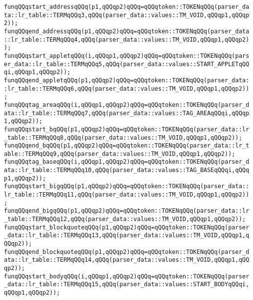 \verb|funqQQqstart_addressqQQq(p1,qQQqp2)qQQq=qQQqtoken::TOKENqQQq(parser_data::lr_table::TERMqQQq3,qQQq(parser_data::values::TM_VOID,qQQqp1,qQQqp2));|\newline
\verb|funqQQqend_addressqQQq(p1,qQQqp2)qQQq=qQQqtoken::TOKENqQQq(parser_data::lr_table::TERMqQQq4,qQQq(parser_data::values::TM_VOID,qQQqp1,qQQqp2));|\newline
\verb|funqQQqstart_appletqQQq(i,qQQqp1,qQQqp2)qQQq=qQQqtoken::TOKENqQQq(parser_data::lr_table::TERMqQQq5,qQQq(parser_data::values::START_APPLETqQQqi,qQQqp1,qQQqp2));|\newline
\verb|funqQQqend_appletqQQq(p1,qQQqp2)qQQq=qQQqtoken::TOKENqQQq(parser_data::lr_table::TERMqQQq6,qQQq(parser_data::values::TM_VOID,qQQqp1,qQQqp2));|\newline
\verb|funqQQqtag_areaqQQq(i,qQQqp1,qQQqp2)qQQq=qQQqtoken::TOKENqQQq(parser_data::lr_table::TERMqQQq7,qQQq(parser_data::values::TAG_AREAqQQqi,qQQqp1,qQQqp2));|\newline
\verb|funqQQqstart_bqQQq(p1,qQQqp2)qQQq=qQQqtoken::TOKENqQQq(parser_data::lr_table::TERMqQQq8,qQQq(parser_data::values::TM_VOID,qQQqp1,qQQqp2));|\newline
\verb|funqQQqend_bqQQq(p1,qQQqp2)qQQq=qQQqtoken::TOKENqQQq(parser_data::lr_table::TERMqQQq9,qQQq(parser_data::values::TM_VOID,qQQqp1,qQQqp2));|\newline
\verb|funqQQqtag_baseqQQq(i,qQQqp1,qQQqp2)qQQq=qQQqtoken::TOKENqQQq(parser_data::lr_table::TERMqQQq10,qQQq(parser_data::values::TAG_BASEqQQqi,qQQqp1,qQQqp2));|\newline
\verb|funqQQqstart_bigqQQq(p1,qQQqp2)qQQq=qQQqtoken::TOKENqQQq(parser_data::lr_table::TERMqQQq11,qQQq(parser_data::values::TM_VOID,qQQqp1,qQQqp2));|\newline
\verb|funqQQqend_bigqQQq(p1,qQQqp2)qQQq=qQQqtoken::TOKENqQQq(parser_data::lr_table::TERMqQQq12,qQQq(parser_data::values::TM_VOID,qQQqp1,qQQqp2));|\newline
\verb|funqQQqstart_blockquoteqQQq(p1,qQQqp2)qQQq=qQQqtoken::TOKENqQQq(parser_data::lr_table::TERMqQQq13,qQQq(parser_data::values::TM_VOID,qQQqp1,qQQqp2));|\newline
\verb|funqQQqend_blockquoteqQQq(p1,qQQqp2)qQQq=qQQqtoken::TOKENqQQq(parser_data::lr_table::TERMqQQq14,qQQq(parser_data::values::TM_VOID,qQQqp1,qQQqp2));|\newline
\verb|funqQQqstart_bodyqQQq(i,qQQqp1,qQQqp2)qQQq=qQQqtoken::TOKENqQQq(parser_data::lr_table::TERMqQQq15,qQQq(parser_data::values::START_BODYqQQqi,qQQqp1,qQQqp2));|\newline
